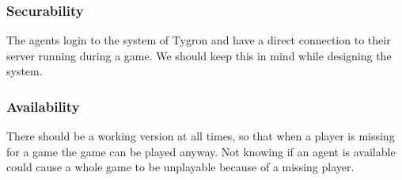 \subsubsection*{Securability}
The agents login to the system of Tygron and have a direct connection to their server running during a game. We should keep this in mind while designing the system.

\subsubsection*{Availability}
There should be a working version at all times, so that when a player is missing for a game the game can be played anyway. Not knowing if an agent is available could cause a whole game to be unplayable because of a missing player.
